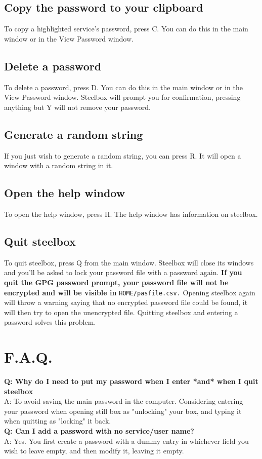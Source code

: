 \documentclass{article}
\begin{document}
  \subsection{Copy the password to your clipboard}
  To copy a highlighted service's password, press C. You can do this in the main window or in the View Password window.

  \subsection{Delete a password}
  To delete a password, press D. You can do this in the main window or in the View Password window. Steelbox will prompt you for
  confirmation, pressing anything but Y will not remove your password.

  \subsection{Generate a random string}
  If you just wish to generate a random string, you can press R. It will open a window with a random string in it.

  \subsection{Open the help window}
  To open the help window, press H. The help window has information on steelbox.

  \subsection{Quit steelbox}
  To quit steelbox, press Q from the main window. Steelbox will close its windows and you'll be asked to lock your password file with a password again.
  \textbf{If you quit the GPG password prompt, your password file will not be encrypted and will be visible in} \texttt{\textdollar HOME/pasfile.csv.}
  Opening steelbox again will throw a warning saying that no encrypted password file could be found, it will then try to open the unencrypted file.
  Quitting steelbox and entering a password solves this problem.

  \section{F.A.Q.}
  \textbf{Q: Why do I need to put my password when I enter *and* when I quit steelbox}\\
  A: To avoid saving the main password in the computer. Considering entering your password when opening still box as "unlocking" your box, and typing
  it when quitting as "locking" it back.\\
  \textbf{Q: Can I add a password with no service/user name?}\\
  A: Yes. You first create a password with a dummy entry in whichever field you wish to leave empty, and then modify it, leaving it empty.
\end{document}
